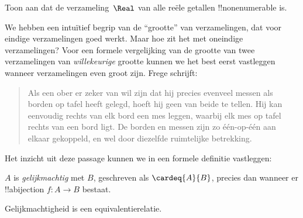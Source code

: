 \documentclass[openany]{memoir}
\begin{document}
\begin{prob}
Toon aan dat de verzameling~$\Real$ van alle reële getallen
!!{nonenumerable} is.
\end{prob}
\endgroup

\begingroup
\def\olfilename{OLP-0035}
\def\olfilepath{content/sets-functions-relations/size-of-sets/}
\hypertarget{unit-OLP-0035}{}





We hebben een intuïtief begrip van de ``grootte'' van verzamelingen, dat voor
eindige verzamelingen goed werkt. Maar hoe zit het met oneindige verzamelingen?
Voor een formele vergelijking van de grootte van twee verzamelingen van
\emph{willekeurige} grootte kunnen we het best eerst vastleggen wanneer
verzamelingen even groot zijn. Frege schrijft:
\begin{quote}
  Als een ober er zeker van wil zijn dat hij precies evenveel messen als
  borden op tafel heeft gelegd, hoeft hij geen van beide te tellen. Hij kan
  eenvoudig rechts van elk bord een mes leggen, waarbij elk mes op tafel
  rechts van een bord ligt. De borden en messen zijn zo één-op-één aan elkaar
  gekoppeld, en wel door diezelfde ruimtelijke betrekking. \citep[\S70]{Frege1884}
\end{quote}
Het inzicht uit deze passage kunnen we in een formele definitie vastleggen:

\begin{defn}
  $A$ is \emph{gelijkmachtig} met $B$, geschreven als $\cardeq{A}{B}$,
  precies dan wanneer er !!a{bijection} $f \colon A \to B$ bestaat.
\end{defn}

\begin{prop}
Gelijkmachtigheid is een equivalentierelatie.
\end{prop}
\end{document}
